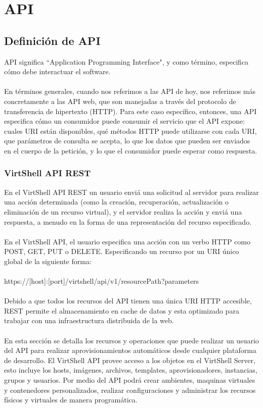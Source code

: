 \chapter{API}
\label{capapi}

\section{Definición de API}
API significa ``Application Programming Interface", y como término, especifica cómo debe interactuar el software.\\
\\
En términos generales, cuando nos referimos a las API de hoy, nos referimos más concretamente a las API web, que son manejadas a través del protocolo de transferencia de hipertexto (HTTP). Para este caso específico, entonces, una API especifica cómo un consumidor puede consumir el servicio que el API expone: cuales URI están disponibles, qué métodos HTTP puede utilizarse con cada URI, que parámetros de consulta se acepta, lo que los datos que pueden ser enviados en el cuerpo de la petición, y lo que el consumidor puede esperar como respuesta.

\subsection{VirtShell API REST}
En el VirtShell API REST un usuario enviá una solicitud al servidor para realizar una acción determinada (como la creación, recuperación, actualización o eliminación de un recurso virtual), y el servidor realiza la acción y enviá una respuesta, a menudo en la forma de una representación del recurso especificado.\\
\\
En el VirtShell API, el usuario especifica una acción con un verbo HTTP como POST, GET, PUT o DELETE. Especificando un recurso por un URI único global de la siguiente forma: \\
\\
https://[host]:[port]/virtshell/api/v1/resourcePath?parameters\\
\\
Debido a que todos los recursos del API tienen una única URI HTTP accesible, REST permite el almacenamiento en cache de datos y esta optimizado para trabajar con una infraestructura distribuida de la web.\\
\\
En esta sección se detalla los recursos y operaciones que puede realizar un usuario del API para realizar aprovisionamientos automáticos desde cualquier plataforma de desarrollo. El VirtShell API provee acceso a los objetos en el VirtShell Server, esto incluye los hosts, imágenes, archivos, templates, aprovisionadores, instancias, grupos y usuarios. Por medio del API podrá crear ambientes, maquinas virtuales y contenedores personalizados, realizar configuraciones y administrar los recursos físicos y virtuales de manera programática. \\

